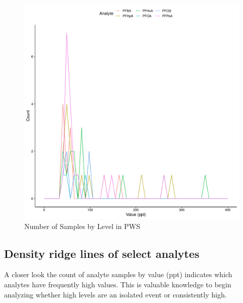 \documentclass[
  12pt,
]{article}
\begin{document}
\begin{figure}

\includegraphics{PFAS_FinalProject_files/figure-latex/unnamed-chunk-5-1} \hfill{}

\caption{Number of Samples by Level in PWS}\label{fig:unnamed-chunk-5}
\end{figure}

\hypertarget{density-ridge-lines-of-select-analytes}{%
\subsection{Density ridge lines of select
analytes}\label{density-ridge-lines-of-select-analytes}}

A closer look the count of analyte samples by value (ppt) indicates
which analytes have frequently high values. This is valuable knowledge
to begin analyzing whether high levels are an isolated event or
consistently high.
\end{document}
